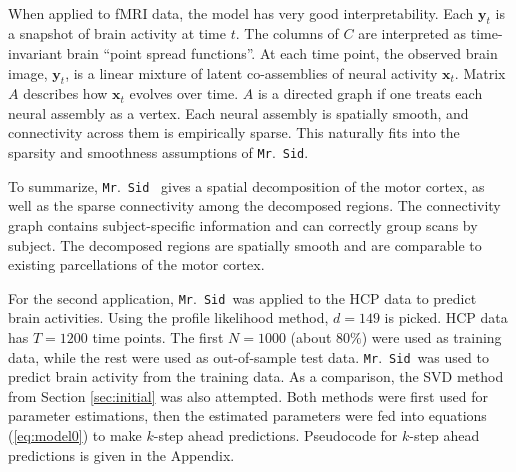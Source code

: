 \documentclass[times,twocolumn,final,authoryear]{elsarticle}
\newcommand{\mrsid}{{\sc \texttt{Mr}.~\texttt{Sid}}}
\providecommand{\mb}[1]{\boldsymbol{#1}}
\newcommand{\bx}{\mb{x}}
\newcommand{\by}{\mb{y}}
\let\oldref\ref
\renewcommand{\ref}[1]{(\oldref{#1})}
\begin{document}
\begin{center}
\[\begin{array}{lll}
\end{array}
\]
\label{fig:3d}
\end{center}

When applied to fMRI data, the model has very good interpretability. Each $\by_t$ is a snapshot of brain activity at time $t$. The columns of $C$ are interpreted as time-invariant brain ``point spread functions''. At each time point, the observed brain image, $\by_t$, is a linear mixture of latent co-assemblies of neural activity  $\bx_t$. Matrix $A$ describes how $\bx_t$ evolves over time. $A$ is a directed graph if one treats each neural assembly as a vertex. Each neural assembly is spatially smooth, and connectivity across them is empirically sparse. This naturally fits into the sparsity and smoothness assumptions of \mrsid.

To summarize, \mrsid~ gives a spatial decomposition of the motor cortex, as well as the sparse connectivity among the decomposed regions. The connectivity graph contains subject-specific information and can correctly group scans by subject. The decomposed regions are spatially smooth and are comparable to existing parcellations of the motor cortex.

For the second application, \mrsid~was applied to the HCP data to predict brain activities.
Using the profile likelihood method, $d=149$ is picked. HCP data has $T=1200$ time points. The first $N = 1000$ (about $80\%$) were used as training data, while the rest were used as out-of-sample test data.
\mrsid~was used to predict brain activity from the training data. As a comparison, the SVD method from Section \oldref{sec:initial} was also attempted. Both methods were first used for parameter estimations, then the estimated parameters were fed into equations \ref{eq:model0} to make $k$-step ahead predictions. Pseudocode for $k$-step ahead predictions is given in the Appendix.
\end{document}

